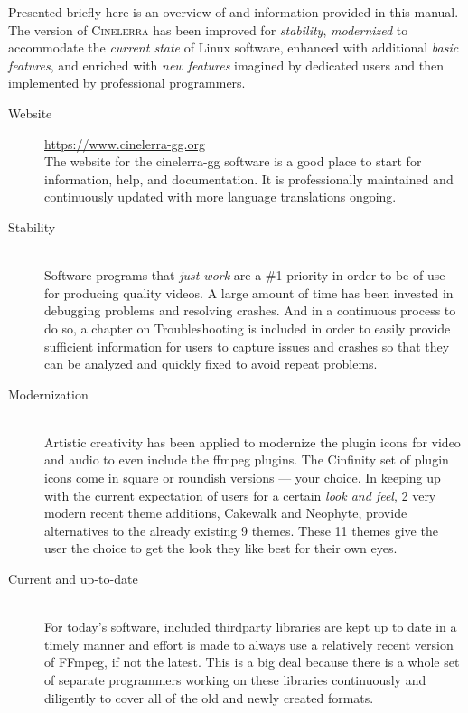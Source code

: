 Presented briefly here is an overview of \CGGI{} and information
provided in this manual. The \GG{} version of \textsc{Cinelerra} has
been improved for \emph{stability}, \emph{modernized} to accommodate
the \emph{current state} of Linux software, enhanced with additional
\emph{basic features}, and enriched with \emph{new features}
imagined by dedicated users and then implemented by professional
programmers.

\begin{description}
    \item[Website] \href{https://www.cinelerra-gg.org}{https://www.cinelerra-gg.org}\\
        The website for the cinelerra-gg software is a good place to start for information, help, and documentation.
        It is professionally maintained and continuously updated with more language
        translations ongoing.
    \item[Stability]~\\
        Software programs that \textit{just work} are a \#1 priority in order to be of use for producing quality videos.
        A large amount of time has been invested in debugging problems and resolving crashes.
        And in a continuous process to do so, a chapter on Troubleshooting is included in order to easily provide sufficient information for users to capture issues and crashes so that they can be analyzed and quickly fixed to avoid repeat problems.
    \item[Modernization]~\\
        Artistic creativity has been applied to modernize the \CGG{} plugin icons for video and audio to even include the ffmpeg plugins.
        The Cinfinity set of plugin icons come in square or roundish versions --- your choice.
        In keeping up with the current expectation of users for a certain \textit{look and feel}, 2 very modern recent theme additions, Cakewalk and Neophyte, provide alternatives to the already existing 9 themes.
        These 11 themes give the user the choice to get the look they like best for their own eyes.
    \item[Current and up-to-date]~\\
        For today’s software, included thirdparty libraries are kept up to date in a timely manner and effort is made to always use a relatively recent version of FFmpeg, if not the latest.
        This is a big deal because there is a whole set of separate programmers working on these libraries continuously and diligently to cover all of the old and newly created formats.

\end{description}
